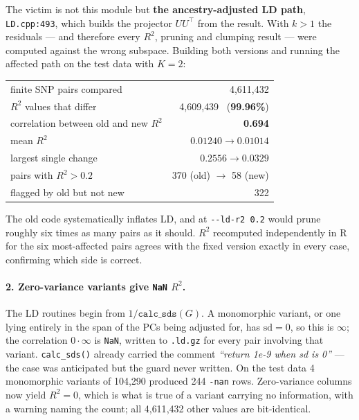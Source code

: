 \documentclass[10pt,a4paper]{article}
\begin{document}
The victim is not this module but \textbf{the ancestry-adjusted LD path}, \texttt{LD.cpp:493}, which builds
the projector $UU^{\!\top}$ from the result. With $k>1$ the residuals --- and therefore every $R^2$, pruning
and clumping result --- were computed against the wrong subspace. Building both versions and running the
affected path on the test data with $K=2$:

\begin{center}
\small
\begin{tabular}{@{}lr@{}}
\toprule
finite SNP pairs compared & 4{,}611{,}432 \\
$R^2$ values that differ & 4{,}609{,}439 \ (\textbf{99.96\%}) \\
correlation between old and new $R^2$ & \textbf{0.694} \\
mean $R^2$ & $0.01240 \rightarrow 0.01014$ \\
largest single change & $0.2556 \rightarrow 0.0329$ \\
\midrule
pairs with $R^2>0.2$ & 370 (old) $\rightarrow$ 58 (new) \\
flagged by old but not new & 322 \\
\bottomrule
\end{tabular}
\end{center}

\noindent
The old code systematically inflates LD, and at \texttt{-{}-ld-r2 0.2} would prune roughly six times as many
pairs as it should. $R^2$ recomputed independently in R for the six most-affected pairs agrees with the fixed
version exactly in every case, confirming which side is correct.

\paragraph{2. Zero-variance variants give \texttt{NaN} $R^2$.} The LD routines begin from
$1/\texttt{calc\_sds}(G)$. A monomorphic variant, or one lying entirely in the span of the PCs being adjusted
for, has $\mathrm{sd}=0$, so this is $\infty$; the correlation $0\cdot\infty$ is \texttt{NaN}, written to
\texttt{.ld.gz} for every pair involving that variant. \texttt{calc\_sds()} already carried the comment
\emph{``return 1e-9 when sd is 0''} --- the case was anticipated but the guard never written. On the test
data 4 monomorphic variants of 104{,}290 produced 244 \texttt{-nan} rows. Zero-variance columns now yield
$R^2=0$, which is what is true of a variant carrying no information, with a warning naming the count; all
4{,}611{,}432 other values are bit-identical.
\end{document}
